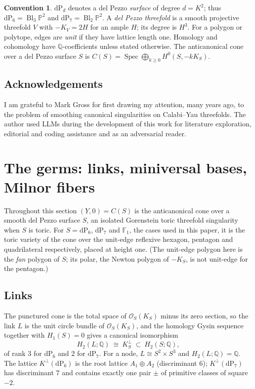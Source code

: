 \documentclass[11pt]{amsart}
\theoremstyle{definition}
\newtheorem{convention}[theorem]{Convention}
\theoremstyle{remark}
\theoremstyle{plain}
\newcommand{\QQ}{\mathbb{Q}}
\newcommand{\PP}{\mathbb{P}}
\newcommand{\cO}{\mathcal{O}}
\newcommand{\Bl}{\operatorname{Bl}}
\newcommand{\dP}{\mathrm{dP}}
\begin{document}
\begin{convention}\label{conv:dp}
$\dP_d$ denotes a del Pezzo \emph{surface} of degree $d=K^2$; thus
$\dP_6=\Bl_3\PP^2$ and $\dP_7=\Bl_2\PP^2$.  A \emph{del Pezzo
threefold} is a smooth projective threefold $V$ with $-K_V=2H$ for an
ample $H$; its degree is $H^3$.  For a polygon or polytope, edges are
\emph{unit} if they have lattice length one.  Homology and cohomology
have $\QQ$-coefficients unless stated otherwise.  The anticanonical
cone over a del Pezzo surface $S$ is
$C(S)=\operatorname{Spec}\bigoplus_{k\ge0}H^0(S,-kK_S)$.
\end{convention}

\subsection*{Acknowledgements}
I am grateful to Mark Gross for first drawing my attention, many years ago, to the problem of smoothing canonical singularities on Calabi--Yau threefolds.
The author used LLMs during the development of this work for literature exploration, editorial and coding assistance and as an adversarial reader.

\section{The germs: links, miniversal bases, Milnor fibers}
\label{sec:germs}

Throughout this section $(Y,0)=C(S)$ is the anticanonical cone over
a smooth del Pezzo surface $S$, an isolated Gorenstein toric threefold
singularity when $S$ is toric.  For $S=\dP_6$, $\dP_7$ and
$\mathbb F_1$, the cases used in this paper, it is the toric variety
of the cone over the unit-edge reflexive hexagon, pentagon and
quadrilateral respectively, placed at height one.  (The
unit-edge polygon here is the \emph{fan} polygon of $S$; its polar,
the Newton polygon of $-K_S$, is not unit-edge for the pentagon.)

\subsection{Links}\label{sec:links}
The punctured cone is the total space of $\cO_S(K_S)$ minus its zero
section, so the link $L$ is the unit circle bundle of $\cO_S(K_S)$,
and the homology Gysin sequence together with $H_1(S)=0$ gives a
canonical isomorphism
\begin{equation}\label{eq:linkH2}
H_2(L;\QQ)\ \cong\ K_S^{\perp}\ \subset\ H_2(S;\QQ),
\end{equation}
of rank $3$ for $\dP_6$ and $2$ for $\dP_7$.  For a node,
$L\cong S^2\times S^3$ and $H_2(L;\QQ)=\QQ$.  The lattice
$K^{\perp}(\dP_6)$ is the root lattice $A_1\oplus A_2$ (discriminant
$6$); $K^{\perp}(\dP_7)$ has discriminant $7$ and contains exactly one
pair $\pm$ of primitive classes of square $-2$.
\end{document}
